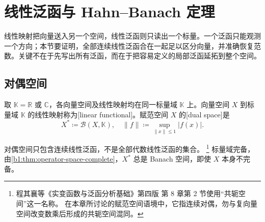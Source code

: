 \section{线性泛函与 Hahn--Banach 定理}
\label{b1:sec:0802}

线性映射把向量送入另一个空间，线性泛函则只读出一个标量。一个泛函只能观测一个方向；本节要证明，全部连续线性泛函合在一起足以区分向量，并准确恢复范数。关键不在于先写出所有泛函，而在于把容易定义的局部泛函延拓到整个空间。

\subsection{对偶空间}
\label{b1:subsec:080201}

\begin{definition}\label{b1:def:dual-space}
取 \(\mathbb K=\mathbb R\) 或 \(\mathbb C\)，各向量空间及线性映射均在同一标量域 \(\mathbb K\) 上。向量空间 \(X\) 到标量域 \(\mathbb K\) 的线性映射称为[linear functional]。赋范空间 \(X\) 的[dual space]是
\[
X^*\coloneqq\mathcal B(X,\mathbb K),
\quad \|f\|\coloneqq\sup_{\|x\|\leq1}|f(x)|.
\]
\end{definition}

对偶空间只包含连续线性泛函，不是全部代数线性泛函的集合。%
\footnote{程其襄等《实变函数与泛函分析基础》第四版\cite{Cheng2019ShibianFanhan}%
第 8 章第 2 节使用“共轭空间”这一名称。
在本章所讨论的赋范空间语境中，它指连续对偶，勿与复向量空间改变数乘后形成的共轭空间混同。}%
标量域完备，由\cref{b1:thm:operator-space-complete}，\(X^*\) 总是 Banach 空间，即使 \(X\) 本身不完备。

